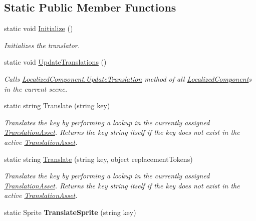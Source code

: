 \subsection*{Static Public Member Functions}
\begin{DoxyCompactItemize}
\item 
static void \hyperlink{class_translator_a500801acca715c9239fce6360d381da4}{Initialize} ()
\begin{DoxyCompactList}\small\item\em Initializes the translator. \end{DoxyCompactList}\item 
static void \hyperlink{class_translator_abca6544e146bc4523fad14e4d9811ef9}{Update\+Translations} ()
\begin{DoxyCompactList}\small\item\em Calls \hyperlink{class_localized_component_a74e7c07ec348cebcd9be67364a66a81d}{Localized\+Component.\+Update\+Translation} method of all \hyperlink{class_localized_component}{Localized\+Component}s in the current scene. \end{DoxyCompactList}\item 
static string \hyperlink{class_translator_a4c9eb0f86f1267f24bb805dd90304746}{Translate} (string key)
\begin{DoxyCompactList}\small\item\em Translates the key by performing a lookup in the currently assigned \hyperlink{class_translation_asset}{Translation\+Asset}. Returns the key string itself if the key does not exist in the active \hyperlink{class_translation_asset}{Translation\+Asset}. \end{DoxyCompactList}\item 
static string \hyperlink{class_translator_a305f299787a705318c0639770219dd7a}{Translate} (string key, object replacement\+Tokens)
\begin{DoxyCompactList}\small\item\em Translates the key by performing a lookup in the currently assigned \hyperlink{class_translation_asset}{Translation\+Asset}. Returns the key string itself if the key does not exist in the active \hyperlink{class_translation_asset}{Translation\+Asset}. \end{DoxyCompactList}\item 
static Sprite {\bfseries Translate\+Sprite} (string key)\hypertarget{class_translator_afe021b2d7c313f6ca7d7204237af2e12}{}\label{class_translator_afe021b2d7c313f6ca7d7204237af2e12}


\end{DoxyCompactItemize}
